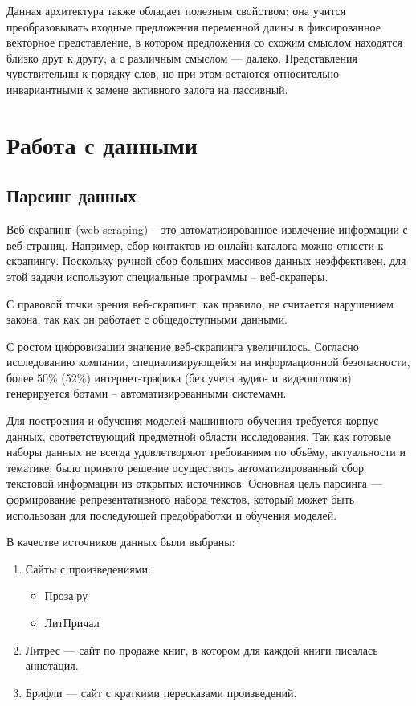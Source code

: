 \documentclass[coursework]{SCWorks}
\begin{document}
    Данная архитектура также обладает полезным свойством:
    она учится преобразовывать входные предложения переменной длины в фиксированное векторное представление,
    в котором предложения со схожим смыслом находятся близко друг к другу, а с различным смыслом — далеко.
    Представления чувствительны к порядку слов, но при этом остаются относительно инвариантными
    к замене активного залога на пассивный.


    \newpage


    \section{Работа с данными}

    \subsection{Парсинг данных}
    Веб-скрапинг (web-scraping) – это автоматизированное извлечение информации с веб-страниц.
    Например, сбор контактов из онлайн-каталога можно отнести к скрапингу.
    Поскольку ручной сбор больших массивов данных неэффективен, для этой задачи используют специальные программы – веб-скраперы.

    С правовой точки зрения веб-скрапинг, как правило, не считается нарушением закона, так как он работает с общедоступными данными.

    С ростом цифровизации значение веб-скрапинга увеличилось.
    Согласно исследованию компании, специализирующейся на информационной безопасности,
    более 50\% (52\%) интернет-трафика (без учета аудио- и видеопотоков) генерируется ботами – автоматизированными системами\cite{moskalenko}.

    Для построения и обучения моделей машинного обучения требуется корпус данных, соответствующий предметной области исследования.
    Так как готовые наборы данных не всегда удовлетворяют требованиям по объёму, актуальности и тематике, было принято решение осуществить автоматизированный сбор текстовой информации из открытых источников.
    Основная цель парсинга — формирование репрезентативного набора текстов, который может быть использован для последующей предобработки и обучения моделей.

    В качестве источников данных были выбраны:
    \begin{enumerate}
        \item Сайты с произведениями:
        \begin{itemize}
            \item Проза.ру
            \item ЛитПричал
        \end{itemize}
        \item Литрес — сайт по продаже книг, в котором для каждой книги писалась аннотация.
        \item Брифли — сайт с краткими пересказами произведений.
    \end{enumerate}
\end{document}
